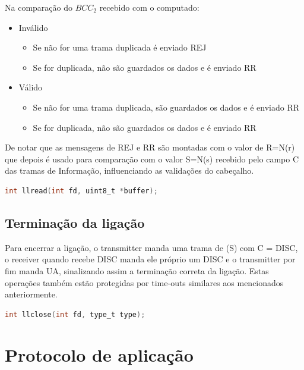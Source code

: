 \documentclass[a4paper,11pt,portuguese]{article}
\begin{document}
    \noindent Na comparação do $BCC_2$ recebido com o computado:
    \begin{itemize}
        \item Inválido
            \begin{itemize}
                \item Se não for uma trama duplicada é enviado REJ
                \item Se for duplicada, não são guardados os dados e é enviado RR
            \end{itemize}
        \item Válido
            \begin{itemize}
                \item Se não for uma trama duplicada, são guardados os dados e é enviado RR
                \item Se for duplicada, não são guardados os dados e é enviado RR
            \end{itemize}
    \end{itemize}

    \noindent De notar que as mensagens de REJ e RR são montadas com o valor de R=N(r) que depois é
    usado para comparação com o valor S=N(s) recebido pelo campo C das tramas de Informação,
    influenciando as validações do cabeçalho.

\begin{lstlisting}[language=C]
int llread(int fd, uint8_t *buffer);
\end{lstlisting}

    \subsection{Terminação da ligação}

    Para encerrar a ligação, o transmitter manda uma trama de (S) com C = DISC, o receiver quando
    recebe DISC manda ele próprio um DISC e o transmitter por fim manda UA, sinalizando assim
    a terminação correta da ligação. Estas operações também estão protegidas por time-outs similares
    aos mencionados anteriormente.

\begin{lstlisting}[language=C]
int llclose(int fd, type_t type);
\end{lstlisting}


\section{Protocolo de aplicação}
\end{document}

